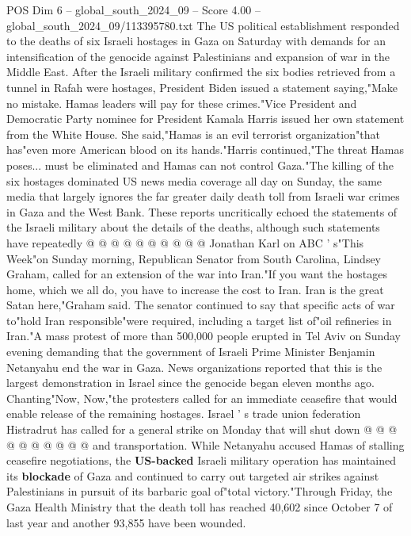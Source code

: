 \begin{textsample}{POS Dim 6 – global\_south\_2024\_09 – Score 4.00 – global\_south\_2024\_09/113395780.txt}  \label{ex:f6_pos_434}
The US political establishment responded to the deaths of six Israeli hostages in Gaza on Saturday with demands for an intensification of the genocide against Palestinians and expansion of war in the Middle East.
After the Israeli military confirmed the six bodies retrieved from a tunnel in Rafah were hostages, President Biden issued a statement saying,"Make no mistake.
Hamas leaders will pay for these crimes."Vice President and Democratic Party nominee for President Kamala Harris issued her own statement from the White House.
She said,"Hamas is an evil terrorist organization"that has"even more American blood on its hands."Harris continued,"The threat Hamas poses... must be eliminated and Hamas can not control Gaza."The killing of the six hostages dominated US news media coverage all day on Sunday, the same media that largely ignores the far greater daily death toll from Israeli war crimes in Gaza and the West Bank.
These reports uncritically echoed the statements of the Israeli military about the details of the deaths, although such statements have repeatedly @ @ @ @ @ @ @ @ @ @ Jonathan Karl on ABC ' s"This Week"on Sunday morning, Republican Senator from South Carolina, Lindsey Graham, called for an extension of the war into Iran."If you want the hostages home, which we all do, you have to increase the cost to Iran.
Iran is the great Satan here,"Graham said.
The senator continued to say that specific acts of war to"hold Iran responsible"were required, including a target list of"oil refineries in Iran."A mass protest of more than 500,000 people erupted in Tel Aviv on Sunday evening demanding that the government of Israeli Prime Minister Benjamin Netanyahu end the war in Gaza.
News organizations reported that this is the largest demonstration in Israel since the genocide began eleven months ago.
Chanting"Now, Now,"the protesters called for an immediate ceasefire that would enable release of the remaining hostages.
Israel ' s trade union federation Histradrut has called for a general strike on Monday that will shut down @ @ @ @ @ @ @ @ @ @ and transportation.
While Netanyahu accused Hamas of stalling ceasefire negotiations, the \textbf{US-backed} Israeli military operation has maintained its \textbf{blockade} of Gaza and continued to carry out targeted air strikes against Palestinians in pursuit of its barbaric goal of"total victory."Through Friday, the Gaza Health Ministry that the death toll has reached 40,602 since October 7 of last year and another 93,855 have been wounded.

\end{textsample}
